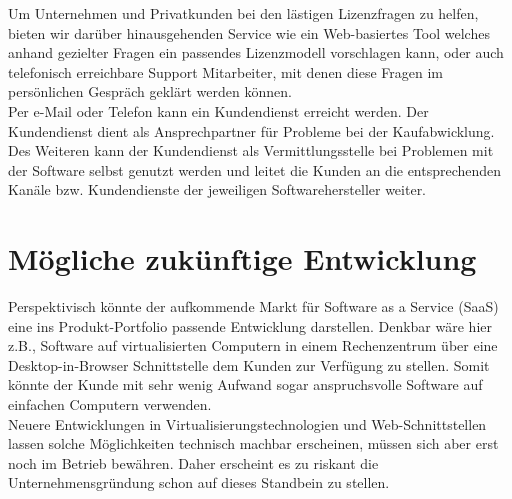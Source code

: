Um Unternehmen und Privatkunden bei den lästigen Lizenzfragen zu helfen, bieten wir darüber hinausgehenden Service wie ein Web-basiertes Tool welches anhand gezielter Fragen ein passendes Lizenzmodell vorschlagen kann, oder auch telefonisch erreichbare Support Mitarbeiter, mit denen diese Fragen im persönlichen Gespräch geklärt werden können.\\ 

Per e-Mail oder Telefon kann ein Kundendienst erreicht werden. Der Kundendienst dient als Ansprechpartner für Probleme bei der Kaufabwicklung. Des Weiteren kann der Kundendienst als Vermittlungsstelle bei Problemen mit der Software selbst genutzt werden und leitet die Kunden an die entsprechenden Kanäle bzw.  Kundendienste der jeweiligen Softwarehersteller weiter. \\

\section{Mögliche zukünftige Entwicklung}
Perspektivisch könnte der aufkommende Markt für Software as a Service (SaaS) eine ins Produkt-Portfolio passende Entwicklung darstellen. Denkbar wäre hier z.B., Software auf virtualisierten Computern in einem Rechenzentrum über eine Desktop-in-Browser Schnittstelle dem Kunden zur Verfügung zu stellen. Somit könnte der Kunde mit sehr wenig Aufwand sogar anspruchsvolle Software auf einfachen Computern verwenden.\\

Neuere Entwicklungen in Virtualisierungstechnologien und Web-Schnittstellen lassen solche Möglichkeiten technisch machbar erscheinen, müssen sich aber erst noch im Betrieb bewähren. Daher erscheint es zu riskant die Unternehmensgründung schon auf dieses Standbein zu stellen.
